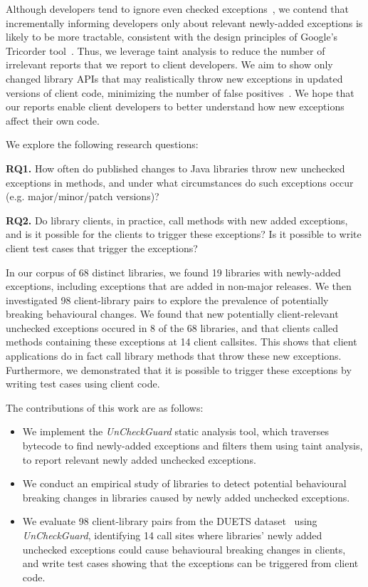 Although developers tend to ignore even checked
exceptions~\cite{nakshatri16:_analy_java}, we contend that incrementally informing
developers only about relevant newly-added exceptions is likely to be more tractable, consistent with the
design principles of Google's Tricorder tool~\cite{sadowski15:_tricor}.
Thus, we leverage taint analysis
to reduce the number of irrelevant reports that we report to client developers.
We aim to show only changed library APIs that may realistically throw new exceptions
in updated versions of client code, minimizing the number of false positives~\cite{pashchenko20:_vuln4,pashchenko18:_vulner}.
We hope that our reports enable client developers to better understand how new exceptions affect their own code.

We explore the following research questions:

\noindent
{\bf RQ1.} How often do published changes to Java libraries throw new unchecked exceptions in methods,
and under what circumstances do such exceptions occur (e.g. major/minor/patch versions)?

\noindent
{\bf RQ2.} Do library clients, in practice, call methods with new added exceptions, and is it possible for the clients to trigger these exceptions? Is it possible to write client test cases that trigger the exceptions?

In our corpus of 68 distinct libraries, we found 19 libraries with newly-added exceptions, including exceptions that are added in non-major releases.
We then investigated 98 client-library pairs to explore the prevalence of potentially breaking behavioural changes.
We found that new potentially client-relevant unchecked exceptions occured in 8 of the 68 libraries, and that clients called methods containing these exceptions at 14 client callsites.
This shows that client applications do in fact call library methods that throw these new exceptions.
Furthermore, we demonstrated that it is possible to trigger these exceptions by writing test cases using client code.

The contributions of this work are as follows:

\begin{itemize}[noitemsep]
\item We implement the \textit{UnCheckGuard} static analysis tool, which traverses bytecode to find newly-added exceptions and filters them using taint analysis, to report relevant newly added unchecked exceptions.
\item We conduct an empirical study of libraries to detect potential behavioural breaking changes in libraries caused by newly added unchecked exceptions.
\item We evaluate 98 client-library pairs from the DUETS dataset~\cite{durieux21:_duets} using \textit{UnCheckGuard}, identifying 14 call sites where libraries' newly added unchecked exceptions could cause behavioural breaking changes in clients, and write test cases showing that the exceptions can be triggered from client code.
\end{itemize}


